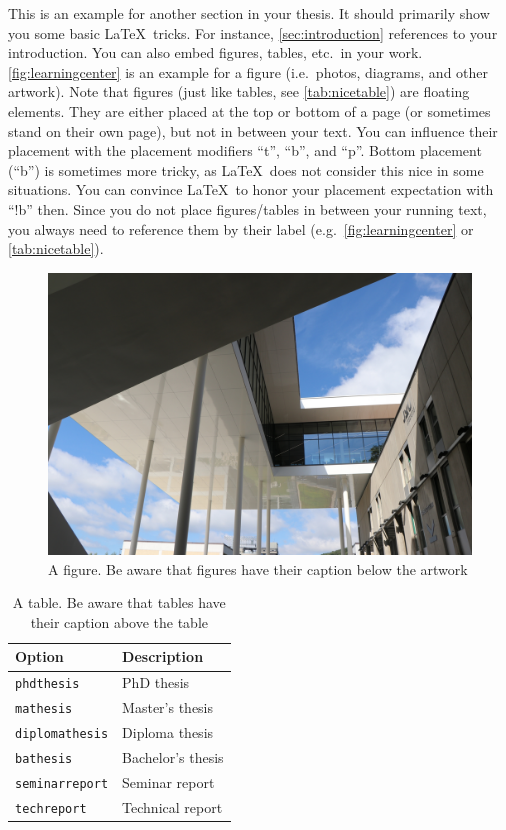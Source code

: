 \documentclass[a4paper,oneside,10pt,ngerman,english]{scrartcl}
\begin{document}
This is an example for another section in your thesis.
It should primarily show you some basic \LaTeX\ tricks.
For instance, \autoref{sec:introduction} references to your introduction.
You can also embed figures, tables, etc.\ in your work.
\autoref{fig:learningcenter} is an example for a figure (i.e.\ photos, diagrams, and other artwork).
Note that figures (just like tables, see \autoref{tab:nicetable}) are floating elements.
They are either placed at the top or bottom of a page (or sometimes stand on their own page), but not in between your text.
You can influence their placement with the placement modifiers ``t'', ``b'', and ``p''.
Bottom placement (``b'') is sometimes more tricky, as \LaTeX\ does not consider this nice in some situations.
You can convince \LaTeX\ to honor your placement expectation with ``!b'' then.
Since you do not place figures/tables in between your running text, you always need to reference them by their label (e.g.\ \autoref{fig:learningcenter} or \autoref{tab:nicetable}).
\begin{figure}[!b]
\centering
\includegraphics[width=\linewidth]{images/jku_learningcenter}
\caption{
    A figure. Be aware that figures have their caption below the artwork
}\label{fig:learningcenter}
\end{figure}
\begin{table}[t]
\centering
\caption{
    A table. Be aware that tables have their caption above the table
}\label{tab:nicetable}
\begin{tabularx}{\linewidth}{l>{\raggedright\arraybackslash}X}
\toprule
\textbf{Option}        & \textbf{Description} \\
\midrule
\texttt{phdthesis}     & PhD thesis \\
\texttt{mathesis}      & Master's thesis \\
\texttt{diplomathesis} & Diploma thesis \\
\texttt{bathesis}      & Bachelor's thesis \\
\texttt{seminarreport} & Seminar report \\
\texttt{techreport}    & Technical report \\
\bottomrule
\end{tabularx}
\end{table}
\end{document}
